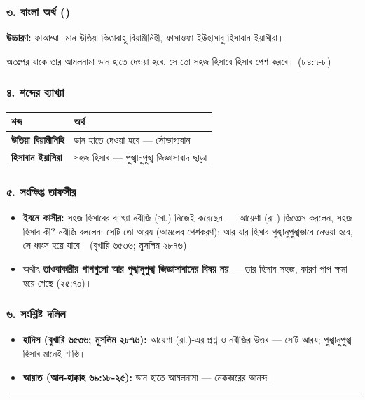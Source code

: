 \subsubsection*{৩. বাংলা অর্থ ()}

\textbf{উচ্চারণ:} ফাআম্মা- মান উতিয়া কিতাবাহু বিয়ামীনিহী, ফাসাওফা ইউহাসাবু হিসাবান ইয়াসীরা।

অতঃপর যাকে তার আমলনামা ডান হাতে দেওয়া হবে, সে তো সহজ হিসাবে হিসাব পেশ করবে। (৮৪:৭-৮)

\subsubsection*{৪. শব্দের ব্যাখ্যা}

\begin{table}[h]\centering\small
\begin{tabular}{ll}
শব্দ & অর্থ \\
\hline
\textbf{উতিয়া বিয়ামীনিহি} & ডান হাতে দেওয়া হবে — সৌভাগ্যবান \\
\textbf{হিসাবান ইয়াসিরা} & সহজ হিসাব — পুঙ্খানুপুঙ্খ জিজ্ঞাসাবাদ ছাড়া \\
\hline
\end{tabular}
\end{table}

\subsubsection*{৫. সংক্ষিপ্ত তাফসীর}

\begin{itemize}
\item \textbf{ইবনে কাসীর:} সহজ হিসাবের ব্যাখ্যা নবীজি (সা.) নিজেই করেছেন — আয়েশা (রা.) জিজ্ঞেস করলেন, সহজ হিসাব কী? নবীজি বললেন: সেটি তো আরয (আমলের পেশকরণ); আর যার হিসাব পুঙ্খানুপুঙ্খভাবে নেওয়া হবে, সে ধ্বংস হয়ে যাবে। (বুখারি ৬৫৩৬; মুসলিম ২৮৭৬)
\item অর্থাৎ \textbf{তাওবাকারীর পাপগুলো আর পুঙ্খানুপুঙ্খ জিজ্ঞাসাবাদের বিষয় নয়} — তার হিসাব সহজ, কারণ পাপ ক্ষমা হয়ে গেছে (২৫:৭০)।
\end{itemize}
\subsubsection*{৬. সংশ্লিষ্ট দলিল}

\begin{itemize}
\item \textbf{হাদিস (বুখারি ৬৫৩৬; মুসলিম ২৮৭৬):} আয়েশা (রা.)-এর প্রশ্ন ও নবীজির উত্তর — সেটি আরয; পুঙ্খানুপুঙ্খ হিসাব মানেই শাস্তি।
\item \textbf{আয়াত (আল-হাক্কাহ ৬৯:১৮-২৫):} ডান হাতে আমলনামা — নেককারের আনন্দ।
\end{itemize}
\medskip\hrule\medskip

